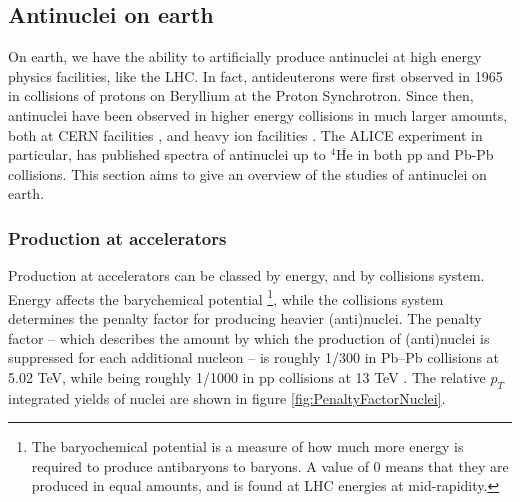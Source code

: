 \subsection{Antinuclei on earth}
On earth, we have the ability to artificially produce antinuclei at high energy physics facilities, like the LHC. In fact, antideuterons were first observed in 1965 in collisions of protons on Beryllium at the Proton Synchrotron\cite{Massam:345976}. Since then, antinuclei have been observed in higher energy collisions in much larger amounts, both at CERN facilities \cite{nuclei_pp_13TeV, nuclei_pp_5TeV, nuclei_pp_PbPb, nuclei_pp}, and heavy ion facilities \cite{}. The ALICE experiment in particular, has published spectra of antinuclei up to $^4\overline{\mathrm{He}}$ \cite{nuclei_pp_13TeV, nuclei_pp_5TeV, nuclei_pp_PbPb, nuclei_pp} in both pp and Pb-Pb collisions. This section aims to give an overview of the studies of antinuclei on earth. 
\subsubsection{Production at accelerators}
Production at accelerators can be classed by energy, and by collisions system. Energy affects the barychemical potential \footnote{The baryochemical potential is a measure of how much more energy is required to produce antibaryons to baryons. A value of 0 means that they are produced in equal amounts, and is found at LHC energies at mid-rapidity\cite{primordial_ratio1, primordial_ratio2}.}, while the collisions system determines the penalty factor for producing heavier (anti)nuclei. The penalty factor -- which describes the amount by which the production of (anti)nuclei is suppressed for each additional nucleon -- is roughly 1/300 in Pb--Pb collisions at 5.02 TeV, while being roughly 1/1000 in pp collisions at 13 TeV \cite{antinuclei_mult_dependence}. The relative $p_T$ integrated yields of nuclei are shown in figure \ref{fig:PenaltyFactorNuclei}. \\

